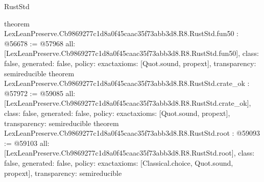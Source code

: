 \begin{lexlean}{RustStd}
\begin{coremodule}
{}
theorem LexLeanPreserve.Cb9869277c1d8a0f45caac35f73abb3d8.R8.RustStd.fun50 : @56678 := @57968 {
  all: [LexLeanPreserve.Cb9869277c1d8a0f45caac35f73abb3d8.R8.RustStd.fun50],
  class: false,
  generated: false,
  policy: exact{axioms: [Quot.sound, propext]},
  transparency: semireducible
}
theorem LexLeanPreserve.Cb9869277c1d8a0f45caac35f73abb3d8.R8.RustStd.crate_ok : @57972 := @59085 {
  all: [LexLeanPreserve.Cb9869277c1d8a0f45caac35f73abb3d8.R8.RustStd.crate_ok],
  class: false,
  generated: false,
  policy: exact{axioms: [Quot.sound, propext]},
  transparency: semireducible
}
theorem LexLeanPreserve.Cb9869277c1d8a0f45caac35f73abb3d8.R8.RustStd.root : @59093 := @59103 {
  all: [LexLeanPreserve.Cb9869277c1d8a0f45caac35f73abb3d8.R8.RustStd.root],
  class: false,
  generated: false,
  policy: exact{axioms: [Classical.choice, Quot.sound, propext]},
  transparency: semireducible
}


\end{coremodule}
\end{lexlean}
